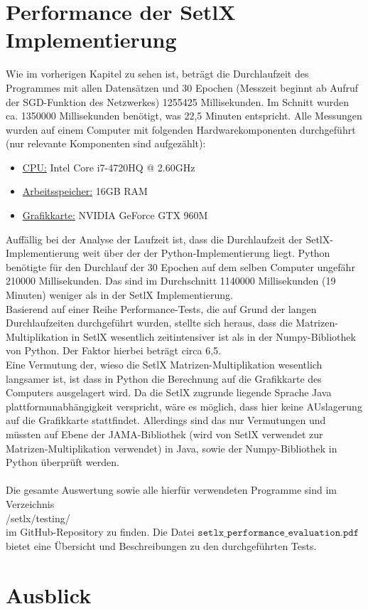 \section{Performance der SetlX Implementierung}
Wie im vorherigen Kapitel zu sehen ist, beträgt die Durchlaufzeit des Programmes mit allen Datensätzen und 30 Epochen (Messzeit beginnt ab Aufruf der SGD-Funktion des Netzwerkes) 1255425 Millisekunden. Im Schnitt wurden ca. 1350000 Millisekunden benötigt, was 22,5 Minuten entspricht. Alle Messungen wurden auf einem Computer mit folgenden Hardwarekomponenten durchgeführt (nur relevante Komponenten sind aufgezählt):
\begin{itemize}
	\item \underline{CPU:} Intel Core i7-4720HQ @ 2.60GHz
	\item \underline{Arbeitsspeicher:} 16GB RAM
	\item \underline{Grafikkarte:} NVIDIA GeForce GTX 960M
\end{itemize}
Auffällig bei der Analyse der Laufzeit ist, dass die Durchlaufzeit der SetlX-Implementierung weit über der der Python-Implementierung liegt. Python benötigte für den Durchlauf der 30 Epochen auf dem selben Computer ungefähr 210000 Millisekunden. Das sind im Durchschnitt 1140000 Millisekunden (19 Minuten) weniger als in der SetlX Implementierung. \\
Basierend auf einer Reihe Performance-Tests, die auf Grund der langen Durchlaufzeiten durchgeführt wurden, stellte sich heraus, dass die Matrizen-Multiplikation in SetlX wesentlich zeitintensiver ist als in der Numpy-Bibliothek von Python. Der Faktor hierbei beträgt circa 6,5. \\
Eine Vermutung der, wieso die SetlX Matrizen-Multiplikation wesentlich langsamer ist, ist dass in Python die Berechnung auf die Grafikkarte des Computers ausgelagert wird. Da die SetlX zugrunde liegende Sprache Java plattformunabhängigkeit verspricht, wäre es möglich, dass hier keine AUslagerung auf die Grafikkarte stattfindet. Allerdings sind das nur Vermutungen und müssten auf Ebene der JAMA-Bibliothek (wird von SetlX verwendet zur Matrizen-Multiplikation verwendet) in Java, sowie der Numpy-Bibliothek in Python überprüft werden. \\ \\
Die gesamte Auswertung sowie alle hierfür verwendeten Programme sind im Verzeichnis
\\[0.2cm]
\hspace*{1.3cm}
/setlx/testing/
\\[0.2cm]
im GitHub-Repository zu finden. Die Datei $\mathtt{setlx\_performance\_evaluation.pdf}$ bietet eine Übersicht und Beschreibungen zu den durchgeführten Tests.

\section{Ausblick}